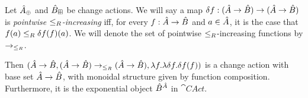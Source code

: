 \begin{prop}[name=Exponentials, restate=exponentials]
\label{prop:exponentials}
  Let $\hat{A}_\oplus$ and $\hat{B}_\boxplus$ be change actions. We will say a map 
  $\delta f : (\hat{A} \rightarrow \hat{B}) \rightarrow (\hat{A} \rightarrow \hat{B})$ 
  is \emph{pointwise $\leq_R$-increasing} iff, for every $f : \hat{A} \rightarrow \hat{B}$
  and $a \in \hat{A}$, it is the case that $f(a) \leq_R \delta f(f)(a)$.
  We will denote the set of pointwise $\leq_R$-increasing functions by $\rightarrow_{\leq_R}$.

  Then $(\hat{A} \rightarrow \hat{B},(\hat{A} \rightarrow \hat{B}) \rightarrow_{\leq_R} (\hat{A} \rightarrow \hat{B}),\lambda f . \lambda \delta f . \delta f(f))$
  is a change action with base
  set $\hat{A} \rightarrow \hat{B}$, with monoidal structure given by function composition.
  Furthermore, it is the exponential object $\hat{B}^{\hat{A}}$ in $\cat{CAct}$.
\end{prop}
\ifproofs
